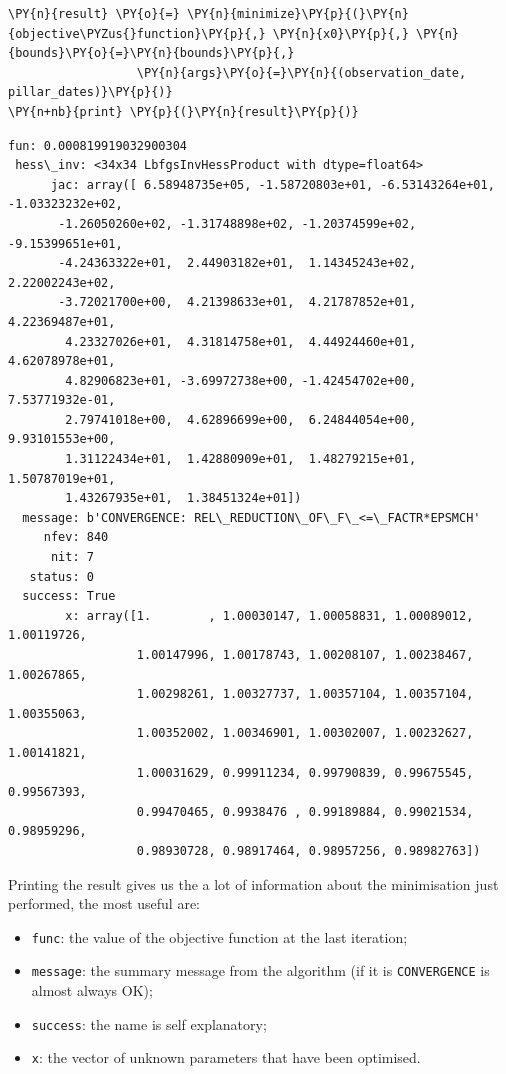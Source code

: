 \begin{itemize}
\begin{codebox}
\begin{Verbatim}[commandchars=\\\{\}]
\PY{n}{result} \PY{o}{=} \PY{n}{minimize}\PY{p}{(}\PY{n}{objective\PYZus{}function}\PY{p}{,} \PY{n}{x0}\PY{p}{,} \PY{n}{bounds}\PY{o}{=}\PY{n}{bounds}\PY{p}{,}
                  \PY{n}{args}\PY{o}{=}\PY{n}{(observation_date, pillar_dates)}\PY{p}{)}
\PY{n+nb}{print} \PY{p}{(}\PY{n}{result}\PY{p}{)}
\end{Verbatim}
\end{codebox}

\begin{Verbatim}[commandchars=\\\{\}]
      fun: 0.000819919032900304
 hess\_inv: <34x34 LbfgsInvHessProduct with dtype=float64>
      jac: array([ 6.58948735e+05, -1.58720803e+01, -6.53143264e+01,
-1.03323232e+02,
       -1.26050260e+02, -1.31748898e+02, -1.20374599e+02, -9.15399651e+01,
       -4.24363322e+01,  2.44903182e+01,  1.14345243e+02,  2.22002243e+02,
       -3.72021700e+00,  4.21398633e+01,  4.21787852e+01,  4.22369487e+01,
        4.23327026e+01,  4.31814758e+01,  4.44924460e+01,  4.62078978e+01,
        4.82906823e+01, -3.69972738e+00, -1.42454702e+00,  7.53771932e-01,
        2.79741018e+00,  4.62896699e+00,  6.24844054e+00,  9.93101553e+00,
        1.31122434e+01,  1.42880909e+01,  1.48279215e+01,  1.50787019e+01,
        1.43267935e+01,  1.38451324e+01])
  message: b'CONVERGENCE: REL\_REDUCTION\_OF\_F\_<=\_FACTR*EPSMCH'
     nfev: 840
      nit: 7
   status: 0
  success: True
        x: array([1.        , 1.00030147, 1.00058831, 1.00089012, 1.00119726,
                  1.00147996, 1.00178743, 1.00208107, 1.00238467, 1.00267865,
                  1.00298261, 1.00327737, 1.00357104, 1.00357104, 1.00355063,
                  1.00352002, 1.00346901, 1.00302007, 1.00232627, 1.00141821,
                  1.00031629, 0.99911234, 0.99790839, 0.99675545, 0.99567393,
                  0.99470465, 0.9938476 , 0.99189884, 0.99021534, 0.98959296,
                  0.98930728, 0.98917464, 0.98957256, 0.98982763])
\end{Verbatim}
\end{itemize}

Printing the result gives us the a lot of information about the minimisation just performed, the most useful are:
\begin{itemize}
\item \texttt{func}: the value of the objective function at the last iteration;
\item \texttt{message}: the summary message from the algorithm (if it is \texttt{CONVERGENCE} is almost always OK);
\item \texttt{success}: the name is self explanatory;
\item \texttt{x}: the vector of unknown parameters that have been optimised.
\end{itemize}

